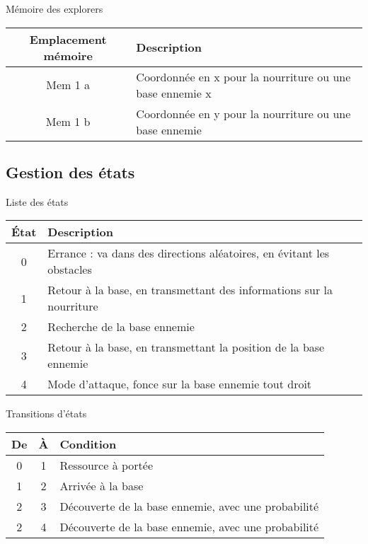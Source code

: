 \documentclass{article}
\begin{document}
\begin{table}[!htb]
	Mémoire des explorers\\
	\begin{tabular}{|c|l|}
		\hline
		Emplacement mémoire & Description\\
		\hline
		Mem 1 a & Coordonnée en x pour la nourriture ou une base ennemie x\\
		Mem 1 b & Coordonnée en y pour la nourriture ou une base ennemie\\
		\hline
	\end{tabular}
\end{table}

\subsection{Gestion des états}

\begin{table}[!htb]
	Liste des états\\
	\begin{tabular}{|c|l|}
		\hline
		État & Description \\
		\hline
		0 & Errance : va dans des directions aléatoires, en évitant les obstacles\\
		\hline
		1 & Retour à la base, en transmettant des informations sur la nourriture\\
		\hline
		2 & Recherche de la base ennemie\\
		\hline
		3 & Retour à la base, en transmettant la position de la base ennemie\\
		\hline
		4 & Mode d'attaque, fonce sur la base ennemie tout droit\\
		\hline
	\end{tabular}
\end{table}

\begin{table}[!htb]
	Transitions d'états\\
	\begin{tabular}{|c|c|l|}
		\hline
		De & À & Condition\\
		\hline
		0 & 1 & Ressource à portée\\
		\hline
		1 & 2 & Arrivée à la base\\
		\hline
		2 & 3 & Découverte de la base ennemie, avec une probabilité\\
		\hline
		2 & 4 & Découverte de la base ennemie, avec une probabilité\\
		\hline
	\end{tabular}
\end{table}
\end{document}
